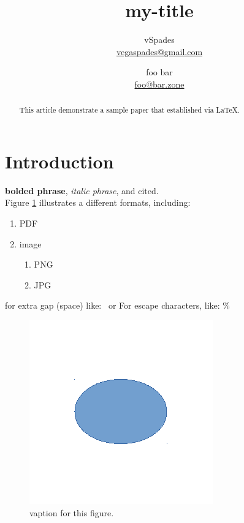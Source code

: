 \documentclass[twocolumn]{article}
\title{my-title}
\author{
vSpades \\ \url{vegaspades@gmail.com}
\and
foo bar \\ \url{foo@bar.zone}
}
\date{}
\begin{document}
\maketitle

\begin{abstract}
This article demonstrate a sample paper that established via \LaTeX.
\end{abstract}

\section{Introduction}\indent

\textbf{bolded phrase}, \textit{italic phrase}, and cited\cite{WEBSITE:1}. \\

Figure \ref{fig:fig1} illustrates a different formats, including:
\begin{enumerate}
\item PDF
\item image
	\begin{enumerate}
	\item PNG
	\item JPG	%
	\end{enumerate}
\end{enumerate}

for extra gap (space) like: \ or For escape characters, like: \%

\begin{figure}
	\includegraphics[width=\linewidth]{asset/fig1.pdf}
	\caption{vaption for this figure.}
	\label{fig:fig1}
\end{figure}
\end{document}
